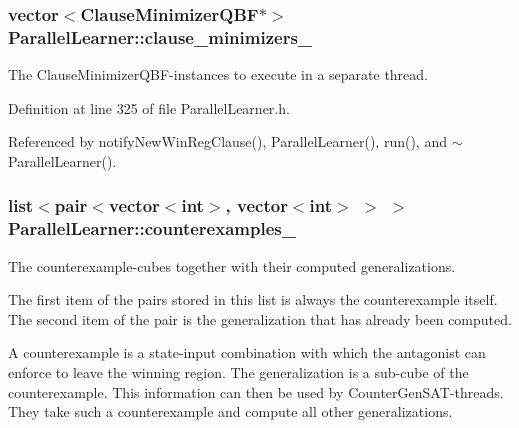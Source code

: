 \hypertarget{classParallelLearner_adb5aa1e016e04c607073eaf90d994dc7}{
\subsubsection[{clause\-\_\-minimizers\-\_\-}]{\setlength{\rightskip}{0pt plus 5cm}vector$<${\bf Clause\-Minimizer\-Q\-B\-F}$\ast$$>$ Parallel\-Learner\-::clause\-\_\-minimizers\-\_\-\hspace{0.3cm}{\ttfamily [protected]}}}\label{classParallelLearner_adb5aa1e016e04c607073eaf90d994dc7}


The Clause\-Minimizer\-Q\-B\-F-\/instances to execute in a separate thread. 



Definition at line 325 of file Parallel\-Learner.\-h.



Referenced by notify\-New\-Win\-Reg\-Clause(), Parallel\-Learner(), run(), and $\sim$\-Parallel\-Learner().

\hypertarget{classParallelLearner_a974943e3e2145b3407f689b64acdd33f}{
\subsubsection[{counterexamples\-\_\-}]{\setlength{\rightskip}{0pt plus 5cm}list$<$pair$<$vector$<$int$>$, vector$<$int$>$ $>$ $>$ Parallel\-Learner\-::counterexamples\-\_\-}}\label{classParallelLearner_a974943e3e2145b3407f689b64acdd33f}


The counterexample-\/cubes together with their computed generalizations. 

The first item of the pairs stored in this list is always the counterexample itself. The second item of the pair is the generalization that has already been computed.

A counterexample is a state-\/input combination with which the antagonist can enforce to leave the winning region. The generalization is a sub-\/cube of the counterexample. This information can then be used by Counter\-Gen\-S\-A\-T-\/threads. They take such a counterexample and compute all other generalizations. 


